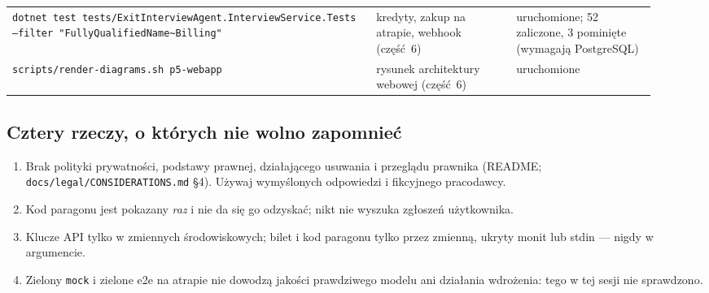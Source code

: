 {\begin{center}
\begin{longtable}{@{}>{\raggedright\arraybackslash}p{0.52\linewidth}>{\raggedright\arraybackslash}p{0.2\linewidth}>{\raggedright\arraybackslash}p{0.2\linewidth}@{}}
\texttt{dotnet test tests/\allowbreak{}ExitInterviewAgent.\allowbreak{}InterviewService.\allowbreak{}Tests --filter "FullyQualifiedName\textasciitilde{}Billing"} & kredyty, zakup na atrapie, webhook (część~6) & uruchomione; 52 zaliczone, 3 pominięte (wymagają PostgreSQL) \\
\texttt{scripts/\allowbreak{}render-\allowbreak{}diagrams.\allowbreak{}sh p5-webapp} & rysunek architektury webowej (część~6) & uruchomione \\
\bottomrule
\end{longtable}
\end{center}

\subsection{Cztery rzeczy, o których nie wolno zapomnieć}

\begin{enumerate}[leftmargin=*,itemsep=2pt]
  \item {} Brak polityki
        prywatności, podstawy prawnej, działającego usuwania i przeglądu prawnika
        (README; \texttt{docs/\allowbreak{}legal/\allowbreak{}CONSIDERATIONS.\allowbreak{}md} §4). Używaj wymyślonych
        odpowiedzi i fikcyjnego pracodawcy.
  \item Kod paragonu jest pokazany \emph{raz} i nie da się go odzyskać; nikt nie
        wyszuka zgłoszeń użytkownika.
  \item Klucze API tylko w zmiennych środowiskowych; bilet i kod paragonu tylko
        przez zmienną, ukryty monit lub stdin --- nigdy w argumencie.
  \item Zielony \texttt{mock} i zielone e2e na atrapie nie dowodzą jakości
        prawdziwego modelu ani działania wdrożenia: tego w tej sesji nie
        sprawdzono.
\end{enumerate}
}
